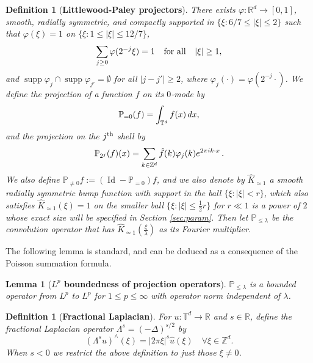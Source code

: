 \documentclass[12pt,reqno,letterpaper]{amsart}
\numberwithin{equation}{section}
\newcommand{\1}{{\bf 1}}
\newcommand{\2}{{\bf 2}}
\newcommand{\R}{\mathbb R}
\newcommand{\T}{\mathbb T}
\newcommand{\Z}{\mathbb Z}
\newtheorem{definition}[theorem]{Definition}
\newtheorem{lemma}[theorem]{Lemma}
\theoremstyle{remark}
\theoremstyle{remark}
\begin{document}
\begin{definition}[\textbf{Littlewood-Paley projectors}]\label{def:projs}
    There exists $\varphi \colon \R^{d}\to[0,1]$, smooth, radially symmetric, and compactly supported in $\{\xi : 6/7 \leq |\xi|\leq 2\}$ such that $\varphi(\xi) = 1$ on $\{\xi : 1 \leq |\xi| \leq 12/7\}$,
    \begin{equation}
        \sum_{j\geq 0}\varphi(2^{-j}\xi)=1 \hspace{0.25cm} \text{ for all } \hspace{0.25cm} |\xi|\geq 1, \notag
    \end{equation}
    and $\operatorname{supp}\varphi_{j}\cap \operatorname{supp} \varphi_{j'}=\emptyset$ for all $|j-j'|\geq 2$, where $\varphi_j(\cdot) = \varphi(2^{-j}\cdot)$. We define the projection of a function $f$ on its $0$-mode by
    \begin{equation}
        \mathbb{P}_{=0}(f)=\int_{\T^d} f(x)\, dx, \notag
    \end{equation}
    and the projection on the $j^{\rm th}$ shell by
    \begin{equation}
        \mathbb{P}_{2^j}(f)(x)=\sum_{k\in \Z^d}\hat{f}(k)\varphi_{j}(k)e^{2\pi ik\cdot x} \, . \notag
    \end{equation}
    We also define $\mathbb{P}_{\neq 0}f:=(\operatorname{Id}-\mathbb{P}_{=0})f$, and we also denote by $\hat{K}_{\simeq 1}$ a smooth radially symmetric bump function with support in the ball $\{\xi: |\xi| < r\} $, which also satisfies $\hat{K}_{\simeq 1}(\xi)=1$ on the smaller ball $\{\xi: |\xi| \leq \frac{1}{2}r\}$ for $r \ll 1$ is a power of $2$ whose exact size will be specified in Section \ref{sec:param}. Then let $\mathbb{P}_{\leq \lambda}$ be the convolution operator that has $\hat{K}_{\simeq 1}\left(\frac{\xi}{\lambda}\right)$ as its Fourier multiplier.
\end{definition}

The following lemma is standard, and can be deduced as a consequence of the Poisson summation formula.

\begin{lemma}[\textbf{$L^p$ boundedness of projection operators}]\label{lem:proj}
    $\mathbb{P}_{\leq \lambda}$ is a bounded operator from $L^p$ to $L^p$ for $1 \leq p \leq \infty$ with operator norm independent of $\lambda$.
\end{lemma}

\begin{definition}[\textbf{Fractional Laplacian}]\label{def:laplace}
    For $u:\T^d \to \R$ and $s \in \R$, define the fractional Laplacian operator $\Lambda^s = (-\Delta)^{s/2}$ by
    $$
        \left(\Lambda^su\right)^{\wedge}(\xi) = |2\pi \xi|^s \hat{u}(\xi) \quad \forall \xi \in \Z^d.
    $$
    When $s < 0$ we restrict the above definition to just those $\xi \not = 0$.
\end{definition}
\end{document}
